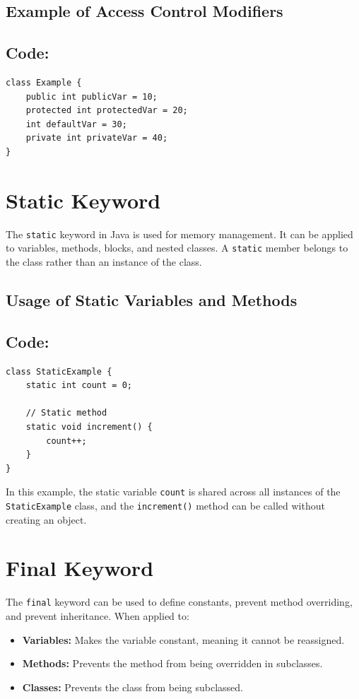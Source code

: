 \documentclass[a4paper,12pt]{article}
\begin{document}
\subsection{Example of Access Control Modifiers}
\subsection{Code: }
\begin{lstlisting}
class Example {
    public int publicVar = 10;
    protected int protectedVar = 20;
    int defaultVar = 30;
    private int privateVar = 40;
}
\end{lstlisting}

\section{Static Keyword}
The \texttt{static} keyword in Java is used for memory management. It can be applied to variables, methods, blocks, and nested classes. A \texttt{static} member belongs to the class rather than an instance of the class.

\subsection{Usage of Static Variables and Methods}
\subsection{Code: }
\begin{lstlisting}
class StaticExample {
    static int count = 0;

    // Static method
    static void increment() {
        count++;
    }
}
\end{lstlisting}
In this example, the static variable \texttt{count} is shared across all instances of the \texttt{StaticExample} class, and the \texttt{increment()} method can be called without creating an object.

\section{Final Keyword}
The \texttt{final} keyword can be used to define constants, prevent method overriding, and prevent inheritance. When applied to:
\begin{itemize}
  \item \textbf{Variables:} Makes the variable constant, meaning it cannot be reassigned.
  \item \textbf{Methods:} Prevents the method from being overridden in subclasses.
  \item \textbf{Classes:} Prevents the class from being subclassed.
\end{itemize}
\end{document}
